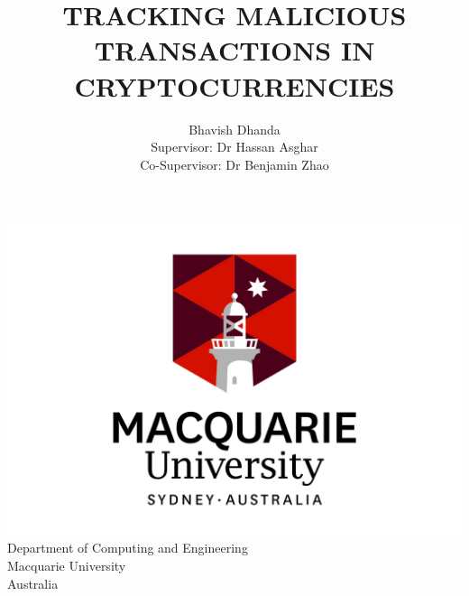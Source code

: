 \documentclass{article}
\begin{document}
\begin{titlepage}
\title{TRACKING MALICIOUS TRANSACTIONS IN CRYPTOCURRENCIES}
\author{Bhavish Dhanda {\\ Supervisor: Dr Hassan Asghar} {\\ Co-Supervisor: Dr Benjamin Zhao}}
\date{}
\end{titlepage}
\maketitle
\begin{center}
    \includegraphics[width=0.7\linewidth]{logo.jpg}\\[4ex]
    Department of Computing and Engineering\\
    Macquarie University\\
    Australia
\end{center}
\pagebreak
\end{document}
